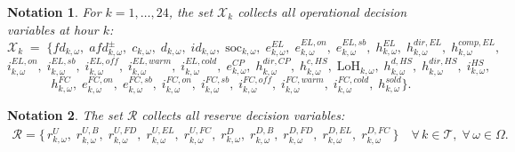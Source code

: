 \documentclass{article}
\newcommand{\soc}{\text{soc}}
\newtheorem{notation}{Notation}[section]
\begin{document}
\begin{notation}
For $k = 1,\ldots,24$, the set $\mathcal{X}_k$ collects all operational decision
variables at hour $k$:
\[
\mathcal{X}_k \;=\;
\bigl\{
  fd_{k,\omega},\; afd^{\pm}_{k,\omega},\;
  c_{k,\omega},\; d_{k,\omega},\; id_{k,\omega},\; \soc_{k,\omega},\;
  e^{EL}_{k,\omega},\; e^{EL,on}_{k,\omega},\; e^{EL,sb}_{k,\omega},\;
  h^{EL}_{k,\omega},\; h^{dir,EL}_{k,\omega},\; h^{comp,EL}_{k,\omega},
\]
\[
  i^{EL,on}_{k,\omega},\; i^{EL,sb}_{k,\omega},\; i^{EL,off}_{k,\omega},\;
  i^{EL,warm}_{k,\omega},\; i^{EL,cold}_{k,\omega},\;
  e^{CP}_{k,\omega},\; h^{dir,CP}_{k,\omega},\; h^{c,HS}_{k,\omega},\;
  \text{LoH}_{k,\omega},\; h^{d,HS}_{k,\omega},\; h^{dir,HS}_{k,\omega},\; i^{HS}_{k,\omega},
\]
\[
  h^{FC}_{k,\omega},\;
  e^{FC,on}_{k,\omega},\; e^{FC,sb}_{k,\omega},\;
  i^{FC,on}_{k,\omega},\; i^{FC,sb}_{k,\omega},\; i^{FC,off}_{k,\omega},\;
  i^{FC,warm}_{k,\omega},\; i^{FC,cold}_{k,\omega},\;
  h^{sold}_{k,\omega}
\bigr\}.
\]
\end{notation}
\begin{notation}
The set $\mathcal{R}$ collects all reserve decision variables:
\begin{align*}
\mathcal{R} = \Big\{\,
  r^{U}_{k,\omega},\; r^{U,B}_{k,\omega},\; r^{U,FD}_{k,\omega},\;
  r^{U,EL}_{k,\omega},\; r^{U,FC}_{k,\omega},\;
  r^{D}_{k,\omega},\; r^{D,B}_{k,\omega},\; r^{D,FD}_{k,\omega},\;
  r^{D,EL}_{k,\omega},\; r^{D,FC}_{k,\omega}
\,\Big\}
\quad \forall\,k\in\mathcal{T},\; \forall\,\omega\in\Omega.
\end{align*}
\end{notation}
\end{document}
